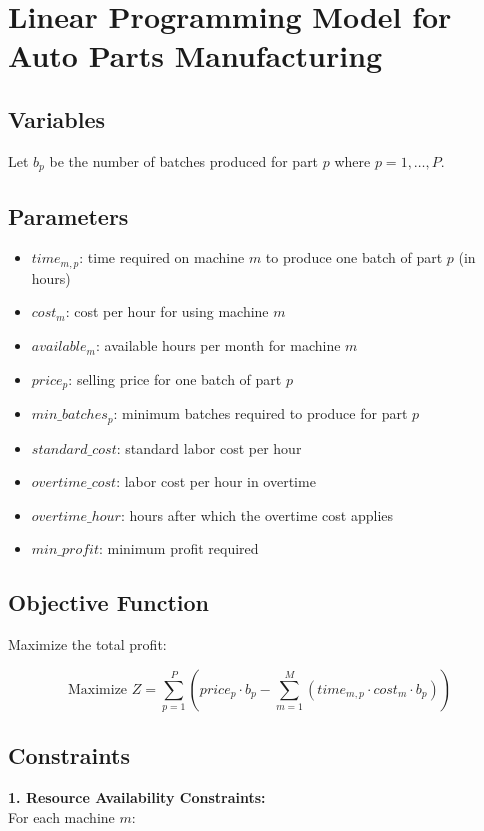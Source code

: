 \documentclass{article}
\begin{document}
\section*{Linear Programming Model for Auto Parts Manufacturing}

\subsection*{Variables}
Let \( b_p \) be the number of batches produced for part \( p \) where \( p = 1, \dots, P \).

\subsection*{Parameters}
\begin{itemize}
    \item \( time_{m,p} \): time required on machine \( m \) to produce one batch of part \( p \) (in hours)
    \item \( cost_{m} \): cost per hour for using machine \( m \)
    \item \( available_{m} \): available hours per month for machine \( m \)
    \item \( price_{p} \): selling price for one batch of part \( p \)
    \item \( min\_batches_{p} \): minimum batches required to produce for part \( p \)
    \item \( standard\_cost \): standard labor cost per hour
    \item \( overtime\_cost \): labor cost per hour in overtime
    \item \( overtime\_hour \): hours after which the overtime cost applies
    \item \( min\_profit \): minimum profit required
\end{itemize}

\subsection*{Objective Function}
Maximize the total profit:

\[
\text{Maximize } Z = \sum_{p=1}^{P} (price_{p} \cdot b_{p} - \sum_{m=1}^{M} (time_{m,p} \cdot cost_{m} \cdot b_{p}))
\]

\subsection*{Constraints}

\textbf{1. Resource Availability Constraints:} \\
For each machine \( m \):
\end{document}
